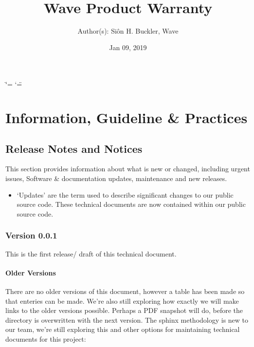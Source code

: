\documentclass[letterpaper,10pt,english]{sphinxmanual}
\title{Wave Product Warranty}
\date{Jan 09, 2019}
\author{Author(s): Siôn H. Buckler, Wave}
\begin{document}
\ifdefined\shorthandoff
  \ifnum\catcode`\=\string=\active\shorthandoff{=}\fi
  \ifnum\catcode`\"=\active{}\fi
\fi
\maketitle
\sphinxtableofcontents
{}\label{\detokenize{index::doc}}



\chapter{Information, Guideline \& Practices}
\label{\detokenize{index:information-guideline-practices}}

\section{Release Notes and Notices}
\label{\detokenize{releasenotes:release-notes-and-notices}}\label{\detokenize{releasenotes::doc}}
This section provides information about what is new or changed, including urgent issues, Software \& documentation updates, maintenance and new releases.
\begin{itemize}
\item {} 
‘Updates’ are the term used to describe significant changes to our public source code. These technical documents are now contained within our public source code.

\end{itemize}


\subsection{Version 0.0.1}
\label{\detokenize{releasenotes:version-0-0-1}}
This is the first release/ draft of this technical document.


\subsubsection{Older Versions}
\label{\detokenize{releasenotes:older-versions}}
There are no older versions of this document, however a table has been made so that enteries can be made. We’re also still exploring how exactly we will make links to the older versions possible. Perhaps a PDF snapshot will do, before the directory is overwritten with the next version. The sphinx methodology is new to our team, we’re still exploring this and other options for maintaining technical documents for this project:
\end{document}
